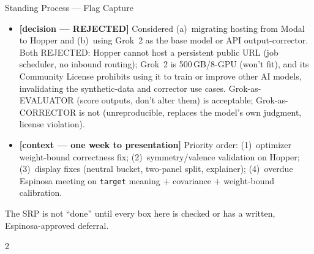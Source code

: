 \documentclass[11pt]{article}
\begin{document}
\begin{taskbox}{Standing Process --- Flag Capture}
{\begin{itemize}[leftmargin=1.6em, itemsep=1pt]
      (2)~\emph{valence test} --- events with known unambiguous direction,
      confirm aggregate $\Delta_\text{eff}$ moves correctly. Run on
      Hopper (free). Required paper/presentation deliverable regardless of
      outcome.
    \item[$\boxtimes$] \textbf{[decision --- REJECTED]} Considered
      (a)~migrating hosting from Modal to Hopper and (b)~using Grok~2 as
      the base model or API output-corrector. Both REJECTED: Hopper cannot
      host a persistent public URL (job scheduler, no inbound routing);
      Grok~2 is 500\,GB/8-GPU (won't fit), and its Community License
      prohibits using it to train or improve other AI models, invalidating
      the synthetic-data and corrector use cases.
      Grok-as-EVALUATOR (score outputs, don't alter them) is acceptable;
      Grok-as-CORRECTOR is not (unreproducible, replaces the model's own
      judgment, license violation).
    \item[$\square$] \textbf{[context --- one week to presentation]}
      Priority order: (1)~optimizer weight-bound correctness fix;
      (2)~symmetry/valence validation on Hopper;
      (3)~display fixes (neutral bucket, two-panel split, explainer);
      (4)~overdue Espinosa meeting on \texttt{target} meaning +
      covariance + weight-bound calibration.
  \end{itemize}
  The SRP is not ``done'' until every box here is checked or has a written,
  Espinosa-approved deferral.}{2}

\end{taskbox}
\end{document}
